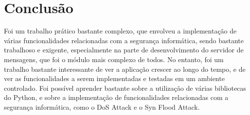 \documentclass[a4paper]{article}
\begin{document}
\section{Conclusão}\label{conclusao}

Foi um trabalho prático bastante complexo, que envolveu a implementação de várias funcionalidades relacionadas com a segurança informática, sendo bastante trabalhoso e exigente, 
especialmente na parte de desenvolvimento do servidor de mensagens, que foi o módulo mais complexo de todos. No entanto, foi um trabalho bastante interessante de ver a aplicação crescer 
ao longo do tempo, e de ver as funcionalidades a serem implementadas e testadas em um ambiente controlado. Foi possível aprender bastante sobre a utilização de várias bibliotecas do Python,
e sobre a implementação de funcionalidades relacionadas com a segurança informática, como o DoS Attack e o Syn Flood Attack. 
\newpage 
\renewcommand{\refname}{Bibliografia} %
\renewcommand{\bibname}{Bibliografia} %
\printbibliography
\end{document}
